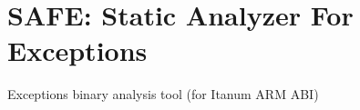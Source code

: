 \chapter{SAFE\+: Static Analyzer For Exceptions}
\hypertarget{index}{}\label{index}
\label{index_md__2home_2mchan_2Senior__Project_2exception-insights_2README}%
%
Exceptions binary analysis tool (for Itanum ARM ABI) 